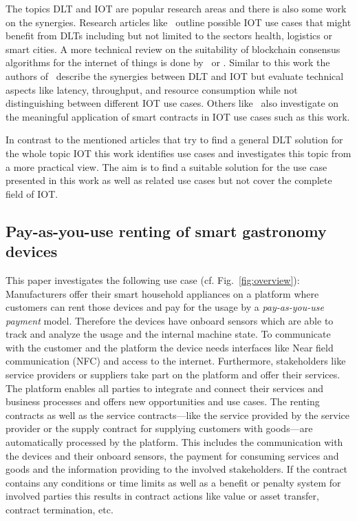 \documentclass[conference]{IEEEtran}
\begin{document}
The topics DLT and IOT are popular research areas and there is also some work on the synergies. Research articles like~\cite{Review2018} outline possible IOT use cases that might benefit from DLTs including but not limited to the sectors health, logistics or smart cities. A more technical review on the suitability of blockchain consensus algorithms for the internet of things is done by~\cite{Salimitari2020} or \cite{Eval2018}. Similar to this work the authors of~\cite{convergence2019} describe the synergies between DLT and IOT but evaluate technical aspects like latency, throughput, and resource consumption while not distinguishing between different IOT use cases. Others like~\cite{SCIOT2016} also investigate on the meaningful application of smart contracts in IOT use cases such as this work.

In contrast to the mentioned articles that try to find a general DLT solution for the whole topic IOT this work identifies use cases and investigates this topic from a more practical view. The aim is to find a suitable solution for the use case presented in this work as well as related use cases but not cover the complete field of IOT.

%
\subsection{Pay-as-you-use renting of smart gastronomy devices}

This paper investigates the following use case (cf. Fig.~\ref{fig:overview}): Manufacturers offer their smart household appliances on a platform where customers can rent those devices and pay for the usage by a \emph{pay-as-you-use payment} model. Therefore the devices have onboard sensors which are able to track and analyze the usage and the internal machine state. To communicate with the customer and the platform the device needs interfaces like Near field communication (NFC) and access to the internet. Furthermore, stakeholders like service providers or suppliers take part on the platform and offer their services. The platform enables all parties to integrate and connect their services and business processes and offers new opportunities and use cases. The renting contracts as well as the service contracts---like the service provided by the service provider or the supply contract for supplying customers with goods---are automatically processed by the platform. This includes the communication with the devices and their onboard sensors, the payment for consuming services and goods and the information providing to the involved stakeholders. If the contract contains any conditions or time limits as well as a benefit or penalty system for involved parties this results in contract actions like value or asset transfer, contract termination, etc.
\end{document}
